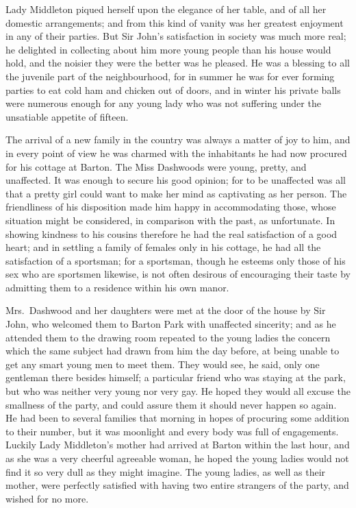 Lady Middleton piqued herself upon the elegance
of her table, and of all her domestic arrangements;
and from this kind of vanity was her greatest enjoyment
in any of their parties.  But Sir John's satisfaction
in society was much more real; he delighted in collecting
about him more young people than his house would hold,
and the noisier they were the better was he pleased.
He was a blessing to all the juvenile part of the neighbourhood,
for in summer he was for ever forming parties to eat cold
ham and chicken out of doors, and in winter his private
balls were numerous enough for any young lady who was not
suffering under the unsatiable appetite of fifteen.

The arrival of a new family in the country was always
a matter of joy to him, and in every point of view he was
charmed with the inhabitants he had now procured for his
cottage at Barton.  The Miss Dashwoods were young, pretty,
and unaffected.  It was enough to secure his good opinion;
for to be unaffected was all that a pretty girl could
want to make her mind as captivating as her person.
The friendliness of his disposition made him happy in
accommodating those, whose situation might be considered,
in comparison with the past, as unfortunate.  In showing
kindness to his cousins therefore he had the real satisfaction
of a good heart; and in settling a family of females only
in his cottage, he had all the satisfaction of a sportsman;
for a sportsman, though he esteems only those of his sex who
are sportsmen likewise, is not often desirous of encouraging
their taste by admitting them to a residence within his own
manor.

Mrs.\ Dashwood and her daughters were met at the door
of the house by Sir John, who welcomed them to Barton
Park with unaffected sincerity; and as he attended them
to the drawing room repeated to the young ladies the concern
which the same subject had drawn from him the day before,
at being unable to get any smart young men to meet them.
They would see, he said, only one gentleman there
besides himself; a particular friend who was staying at
the park, but who was neither very young nor very gay.
He hoped they would all excuse the smallness of the party,
and could assure them it should never happen so again.
He had been to several families that morning in hopes
of procuring some addition to their number, but it
was moonlight and every body was full of engagements.
Luckily Lady Middleton's mother had arrived at Barton
within the last hour, and as she was a very cheerful
agreeable woman, he hoped the young ladies would not find
it so very dull as they might imagine.  The young ladies,
as well as their mother, were perfectly satisfied with
having two entire strangers of the party, and wished for
no more.

